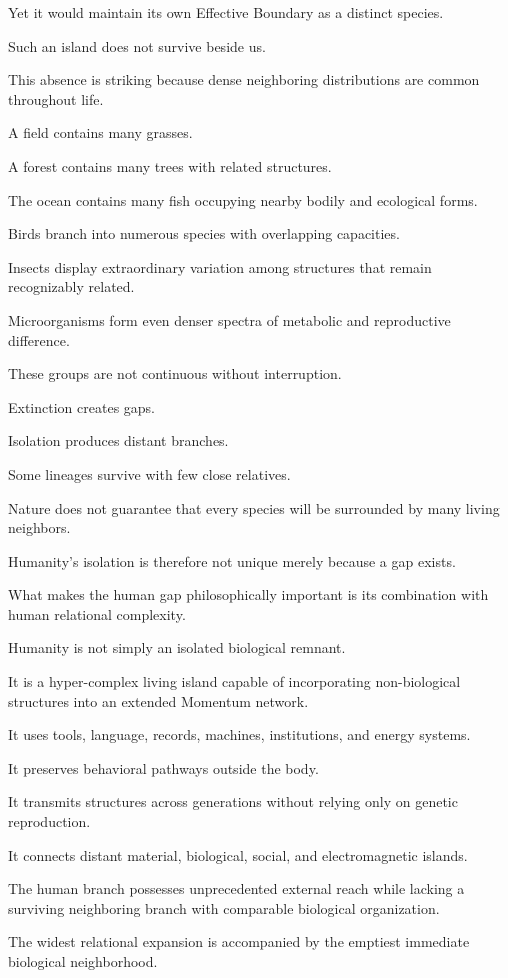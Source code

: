 Yet it would maintain its own Effective Boundary as a distinct species.

Such an island does not survive beside us.

This absence is striking because dense neighboring distributions are common throughout life.

A field contains many grasses.

A forest contains many trees with related structures.

The ocean contains many fish occupying nearby bodily and ecological forms.

Birds branch into numerous species with overlapping capacities.

Insects display extraordinary variation among structures that remain recognizably related.

Microorganisms form even denser spectra of metabolic and reproductive difference.

These groups are not continuous without interruption.

Extinction creates gaps.

Isolation produces distant branches.

Some lineages survive with few close relatives.

Nature does not guarantee that every species will be surrounded by many living neighbors.

Humanity’s isolation is therefore not unique merely because a gap exists.

What makes the human gap philosophically important is its combination with human relational complexity.

Humanity is not simply an isolated biological remnant.

It is a hyper-complex living island capable of incorporating non-biological structures into an extended Momentum network.

It uses tools, language, records, machines, institutions, and energy systems.

It preserves behavioral pathways outside the body.

It transmits structures across generations without relying only on genetic reproduction.

It connects distant material, biological, social, and electromagnetic islands.

The human branch possesses unprecedented external reach while lacking a surviving neighboring branch with comparable biological organization.

The widest relational expansion is accompanied by the emptiest immediate biological neighborhood.

